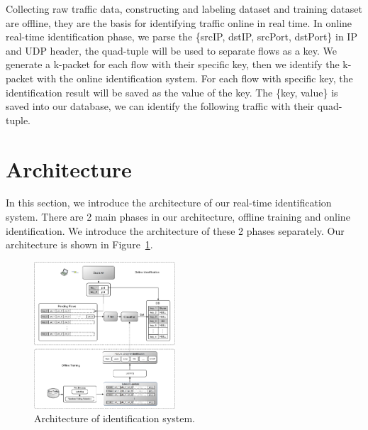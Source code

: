 \documentclass[conference]{IEEEtran}
\begin{document}
Collecting raw traffic data, constructing and labeling dataset and training dataset are offline, they are the basis for identifying traffic online in real time. In online real-time identification phase, we parse the \{srcIP, dstIP, srcPort, dstPort\} in IP and UDP header, the quad-tuple will be used to separate flows as a key. We generate a k-packet for each flow with their specific key, then we identify the k-packet with the online identification system. For each flow with specific key, the identification result will be saved as the value of the key. The \{key, value\} is saved into our database, we can identify the following traffic with their quad-tuple.

\section{Architecture}
\label{sec:architecture}
In this section, we introduce the architecture of our real-time identification system. There are 2 main phases in our architecture, offline training and online identification. We introduce the architecture of these 2 phases separately.
Our architecture is shown in Figure~\ref{fig:architecture}.

\begin{figure}[htp]
\begin{center}
\includegraphics[width=0.47\textwidth]{architecture.eps}
\caption{Architecture of identification system.}\label{fig:architecture}
\end{center}
\end{figure}
\end{document}
